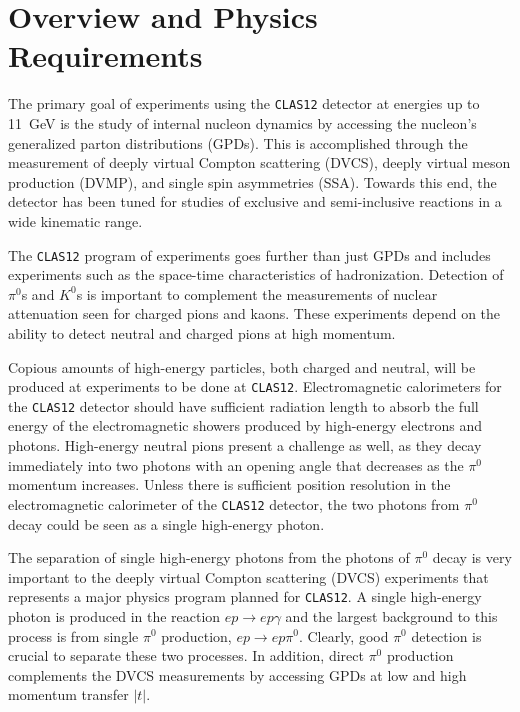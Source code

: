 \section{Overview and Physics Requirements}

The primary goal of experiments using the {\tt CLAS12} detector at energies
up to 11~GeV is the study of internal nucleon dynamics by accessing the 
nucleon's generalized parton distributions (GPDs).  This is accomplished 
through the measurement of deeply virtual Compton scattering (DVCS), deeply 
virtual meson production (DVMP), and single spin asymmetries (SSA). Towards 
this end, the detector has been tuned for studies of exclusive and 
semi-inclusive reactions in a wide kinematic range. 

The {\tt CLAS12} program of experiments goes further than just GPDs and 
includes experiments such as the space-time characteristics of 
hadronization. Detection of $\pi^0$s and $K^0$s is important to 
complement the measurements of nuclear attenuation seen for charged pions
and kaons.  These experiments depend on the ability to detect neutral and
charged pions at high momentum.

Copious amounts of high-energy particles, both charged and neutral, will be 
produced at experiments to be done at {\tt CLAS12}.  Electromagnetic
calorimeters for the {\tt CLAS12} detector should have sufficient radiation
length to absorb the full energy of the electromagnetic showers produced by 
high-energy electrons and photons.  High-energy neutral pions present a 
challenge as well, as they decay immediately into two photons with an 
opening angle that decreases as the $\pi^0$ momentum increases.  Unless 
there is sufficient position resolution in the electromagnetic calorimeter 
of the {\tt CLAS12} detector, the two photons from $\pi^0$ decay could be 
seen as a single high-energy photon.

The separation of single high-energy photons from the photons of $\pi^0$ 
decay is very important to the deeply virtual Compton scattering (DVCS) 
experiments that represents a major physics program planned for {\tt CLAS12}.
A single high-energy photon is produced in the reaction $ep \to ep\gamma$
and the largest background to this process is from single $\pi^0$ 
production, $ep \to ep\pi^0$.  Clearly, good $\pi^0$ detection is crucial 
to separate these two processes.  In addition, direct $\pi^0$ production 
complements the DVCS measurements by accessing GPDs at low and high 
momentum transfer $|t|$.


